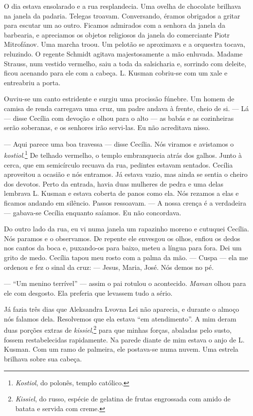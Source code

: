 O dia estava ensolarado e a rua resplandecia. Uma ovelha de chocolate
brilhava na janela da padaria. Telegas troavam. Conversando, éramos
obrigados a gritar para escutar um ao outro. Ficamos admirados com a
senhora da janela da barbearia, e apreciamos os objetos religiosos da
janela do comerciante Piotr Mitrofánov. Uma marcha troou. Um pelotão se
aproximava e a orquestra tocava, reluzindo. O regente Schmidt agitava
majestosamente a mão enluvada. Madame Strauss, num vestido vermelho,
saiu a toda da salsicharia e, sorrindo com deleite, ficou acenando para
ele com a cabeça. L. Kusman cobriu-se com um xale e entreabriu a porta.

Ouviu-se um canto estridente e surgiu uma procissão fúnebre. Um homem de
camisa de renda carregava uma cruz, um padre andava à frente, cheio de
si. --- Lá --- disse Cecília com devoção e olhou para o alto --- as
babás e as cozinheiras serão soberanas, e os senhores irão servi-las. Eu
não acreditava nisso.

--- Aqui parece uma boa travessa --- disse Cecília. Nós viramos e
avistamos o \emph{kostiol}.\footnote{\emph{Kostiol}, do polonês, templo
  católico.} De telhado vermelho, o templo embranquecia atrás dos
galhos. Junto à cerca, que em semicírculo recuava da rua, pedintes
estavam sentados. Cecília aproveitou a ocasião e nós entramos. Já estava
vazio, mas ainda se sentia o cheiro dos devotos. Perto da entrada, havia
duas mulheres de pedra e uma delas lembrava L. Kusman e estava coberta
de panos como ela. Nós rezamos a elas e ficamos andando em silêncio.
Passos ressoavam. --- A nossa crença é a verdadeira --- gabava-se
Cecília enquanto saíamos. Eu não concordava.

Do outro lado da rua, eu vi numa janela um rapazinho moreno e cutuquei
Cecília. Nós paramos e o observamos. De repente ele envesgou os olhos,
enfiou os dedos nos cantos da boca e, puxando-os para baixo, meteu a
língua para fora. Dei um grito de medo. Cecília tapou meu rosto com a
palma da mão. --- Cuspa --- ela me ordenou e fez o sinal da cruz: ---
Jesus, Maria, José. Nós demos no pé.

--- ``Um menino terrível'' --- assim o pai rotulou o acontecido.
\emph{Maman} olhou para ele com desgosto. Ela preferia que levassem tudo
a sério.

Já fazia três dias que Aleksandra Lvovna Lei não aparecia, e durante o
almoço nós falamos dela. Resolvemos que ela estava ``em atendimento''. A
mim deram duas porções extras de \emph{kissiel},\footnote{\emph{Kissiel},
  do russo, espécie de gelatina de frutas engrossada com amido de batata
  e servida com creme.} para que minhas forças, abaladas pelo susto,
fossem restabelecidas rapidamente. Na parede diante de mim estava o anjo
de L. Kusman. Com um ramo de palmeira, ele postava-se numa nuvem. Uma
estrela brilhava sobre sua cabeça.

